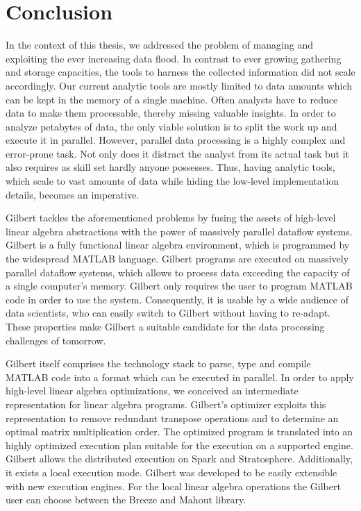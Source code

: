 \chapter{Conclusion}
\label{cha:conclusion}


In the context of this thesis, we addressed the problem of managing and exploiting the ever increasing data flood.
In contrast to ever growing gathering and storage capacities, the tools to harness the collected information did not scale accordingly.
Our current analytic tools are mostly limited to data amounts which can be kept in the memory of a single machine.
Often analysts have to reduce data to make them processable, thereby missing valuable insights.
In order to analyze petabytes of data, the only viable solution is to split the work up and execute it in parallel.
However, parallel data processing is a highly complex and error-prone task.
Not only does it distract the analyst from its actual task but it also requires as skill set hardly anyone possesses.
Thus, having analytic tools, which scale to vast amounts of data while hiding the low-level implementation details, becomes an imperative.

Gilbert tackles the aforementioned problems by fusing the assets of high-level linear algebra abstractions with the power of massively parallel dataflow systems.
Gilbert is a fully functional linear algebra environment, which is programmed by the widespread MATLAB language.
Gilbert programs are executed on massively parallel dataflow systems, which allows to process data exceeding the capacity of a single computer's memory.
Gilbert only requires the user to program MATLAB code in order to use the system.
Consequently, it is usable by a wide audience of data scientists, who can easily switch to Gilbert without having to re-adapt.
These properties make Gilbert a suitable candidate for the data processing challenges of tomorrow.

Gilbert itself comprises the technology stack to parse, type and compile MATLAB code into a format which can be executed in parallel.
In order to apply high-level linear algebra optimizations, we conceived an intermediate representation for linear algebra programs.
Gilbert's optimizer exploits this representation to remove redundant transpose operations and to determine an optimal matrix multiplication order.
The optimized program is translated into an highly optimized execution plan suitable for the execution on a supported engine.
Gilbert allows the distributed execution on Spark and Stratosphere.
Additionally, it exists a local execution mode.
Gilbert was developed to be easily extensible with new execution engines.
For the local linear algebra operations the Gilbert user can choose between the Breeze and Mahout library.

